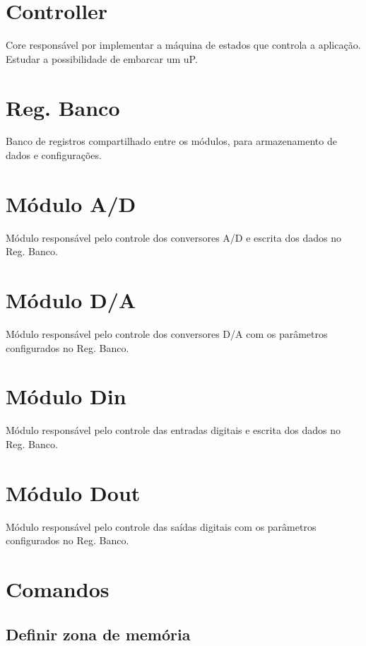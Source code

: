 \section{Controller}

Core responsável por implementar a máquina de estados que controla a aplicação. Estudar a possibilidade de embarcar um uP.

\section{Reg. Banco}

Banco de registros compartilhado entre os módulos, para armazenamento de dados e configurações.

\section{Módulo A/D}

Módulo responsável pelo controle dos conversores A/D e escrita dos dados no Reg. Banco.

\section{Módulo D/A}

Módulo responsável pelo controle dos conversores D/A com os parâmetros configurados no Reg. Banco.

\section{Módulo Din}

Módulo responsável pelo controle das entradas digitais e escrita dos dados no Reg. Banco.

\section{Módulo Dout}	

Módulo responsável pelo controle das saídas digitais com os parâmetros configurados no Reg. Banco.

\section{Comandos}


\subsection{Definir zona de memória}

